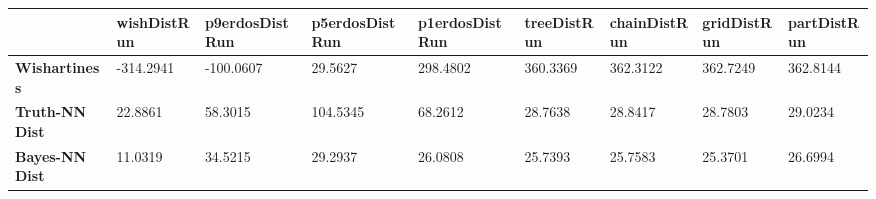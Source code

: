\begin{tabular}{|l|l|l|l|l|l|l|l|l|}
\hline
&\textbf{wishDistRun}&\textbf{p9erdosDistRun}&\textbf{p5erdosDistRun}&\textbf{p1erdosDistRun}&\textbf{treeDistRun}&\textbf{chainDistRun}&\textbf{gridDistRun}&\textbf{partDistRun}\\\hline
\textbf{Wishartiness}&-314.2941&-100.0607&29.5627&298.4802&360.3369&362.3122&362.7249&362.8144\\\hline
\textbf{Truth-NN Dist}&22.8861&58.3015&104.5345&68.2612&28.7638&28.8417&28.7803&29.0234\\\hline
\textbf{Bayes-NN Dist}&11.0319&34.5215&29.2937&26.0808&25.7393&25.7583&25.3701&26.6994\\\hline
\end{tabular}

